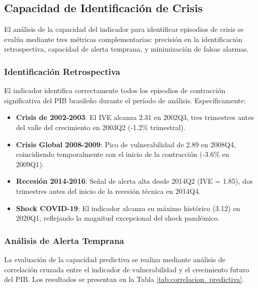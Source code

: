 \documentclass[3p,11pt]{elsarticle}
\begin{document}
\subsection{Capacidad de Identificación de Crisis}

El análisis de la capacidad del indicador para identificar episodios de crisis se evalúa mediante tres métricas complementarias: precisión en la identificación retrospectiva, capacidad de alerta temprana, y minimización de falsas alarmas.

\subsubsection{Identificación Retrospectiva}

El indicador identifica correctamente todos los episodios de contracción significativa del PIB brasileño durante el período de análisis. Específicamente:

\begin{itemize}
    \item \textbf{Crisis de 2002-2003}: El IVE alcanza 2.31 en 2002Q3, tres trimestres antes del valle del crecimiento en 2003Q2 (-1.2\% trimestral).
    
    \item \textbf{Crisis Global 2008-2009}: Pico de vulnerabilidad de 2.89 en 2008Q4, coincidiendo temporalmente con el inicio de la contracción (-3.6\% en 2009Q1).
    
    \item \textbf{Recesión 2014-2016}: Señal de alerta alta desde 2014Q2 (IVE = 1.85), dos trimestres antes del inicio de la recesión técnica en 2014Q4.
    
    \item \textbf{Shock COVID-19}: El indicador alcanza su máximo histórico (3.12) en 2020Q1, reflejando la magnitud excepcional del shock pandémico.
\end{itemize}

\subsubsection{Análisis de Alerta Temprana}

La evaluación de la capacidad predictiva se realiza mediante análisis de correlación cruzada entre el indicador de vulnerabilidad y el crecimiento futuro del PIB. Los resultados se presentan en la Tabla \ref{tab:correlacion_predictiva}.
\end{document}
